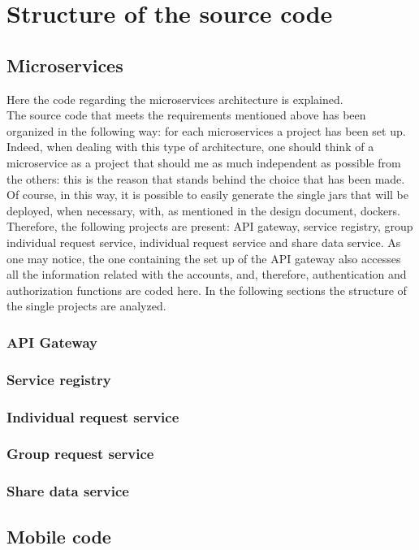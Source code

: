 \section{Structure of the source code}

\subsection{Microservices}
Here the code regarding the microservices architecture is explained. \\
The source code that meets the requirements mentioned above has been organized in the following way: for each microservices a project
has been set up. 
Indeed, when dealing with this type of architecture, one should think of a microservice
as a project that should me as much independent as possible from the others: this is the reason that stands behind the choice that has been
made. 
Of course, in this way, it is possible to easily generate the single jars that will be deployed, when necessary, with, as mentioned
in the design document, dockers. Therefore, the following projects are present: API gateway, service registry, group individual request
service, individual request service and share data service. 
As one may notice, the one containing the set up of the API gateway also accesses all the information related with the accounts, and, therefore, authentication and authorization functions are coded here.
In the following sections the structure of the single projects are analyzed. 

\subsubsection{API Gateway}

\subsubsection{Service registry}

\subsubsection{Individual request service}

\subsubsection{Group request service}

\subsubsection{Share data service}

\subsection{Mobile code}
